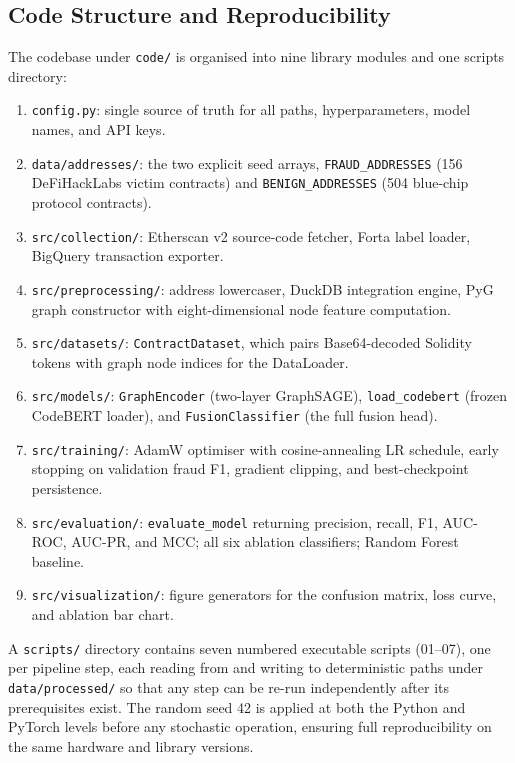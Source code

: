 \subsection{Code Structure and Reproducibility}

The codebase under \texttt{code/} is organised into nine library modules
and one scripts directory:

\begin{enumerate}
    \item \texttt{config.py}: single source of truth for all paths,
    hyperparameters, model names, and API keys.
    \item \texttt{data/addresses/}: the two explicit seed arrays,
    \texttt{FRAUD\_ADDRESSES} (156 DeFiHackLabs victim contracts) and
    \texttt{BENIGN\_ADDRESSES} (504 blue-chip protocol contracts).
    \item \texttt{src/collection/}: Etherscan v2 source-code fetcher,
    Forta label loader, BigQuery transaction exporter.
    \item \texttt{src/preprocessing/}: address lowercaser, DuckDB
    integration engine, PyG graph constructor with eight-dimensional
    node feature computation.
    \item \texttt{src/datasets/}: \texttt{ContractDataset}, which
    pairs Base64-decoded Solidity tokens with graph node indices for
    the DataLoader.
    \item \texttt{src/models/}: \texttt{GraphEncoder} (two-layer
    GraphSAGE), \texttt{load\_codebert} (frozen CodeBERT loader), and
    \texttt{FusionClassifier} (the full fusion head).
    \item \texttt{src/training/}: AdamW optimiser with cosine-annealing
    LR schedule, early stopping on validation fraud F1, gradient
    clipping, and best-checkpoint persistence.
    \item \texttt{src/evaluation/}: \texttt{evaluate\_model} returning
    precision, recall, F1, AUC-ROC, AUC-PR, and MCC; all six ablation
    classifiers; Random Forest baseline.
    \item \texttt{src/visualization/}: figure generators for the
    confusion matrix, loss curve, and ablation bar chart.
\end{enumerate}

A \texttt{scripts/} directory contains seven numbered executable
scripts (01--07), one per pipeline step, each reading from and writing
to deterministic paths under \texttt{data/processed/} so that any step
can be re-run independently after its prerequisites exist.
The random seed 42 is applied at both the Python and PyTorch levels
before any stochastic operation, ensuring full reproducibility on the
same hardware and library versions.
